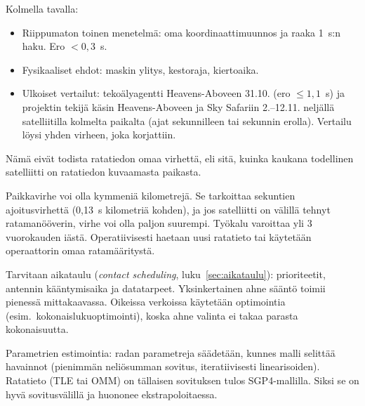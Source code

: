 \documentclass[a4paper,11pt]{article}
\begin{document}
Kolmella tavalla:
\begin{itemize}
  \item Riippumaton toinen menetelmä: oma koordinaattimuunnos ja raaka 1~s:n haku. Ero $< 0,3$~s.
  \item Fysikaaliset ehdot: maskin ylitys, kestoraja, kiertoaika.
  \item Ulkoiset vertailut: tekoälyagentti Heavens-Aboveen 31.10. (ero $\leq 1,1$~s) ja
    projektin tekijä käsin Heavens-Aboveen ja Sky Safariin 2.--12.11. neljällä satelliitilla kolmelta paikalta
    (ajat sekunnilleen tai sekunnin erolla). Vertailu löysi yhden virheen, joka korjattiin.
\end{itemize}
Nämä eivät todista ratatiedon omaa virhettä, eli sitä, kuinka kaukana todellinen satelliitti on ratatiedon kuvaamasta paikasta.

Paikkavirhe voi olla kymmeniä kilometrejä. Se tarkoittaa sekuntien ajoitusvirhettä (0,13~s kilometriä kohden), ja jos satelliitti on välillä tehnyt ratamanööverin, virhe voi olla paljon suurempi. Työkalu varoittaa yli 3 vuorokauden iästä. Operatiivisesti haetaan uusi ratatieto tai käytetään operaattorin omaa ratamääritystä.

Tarvitaan aikataulu (\emph{contact scheduling}, luku~\ref{sec:aikataulu}): prioriteetit, antennin kääntymisaika ja datatarpeet. Yksinkertainen ahne sääntö toimii pienessä mittakaavassa. Oikeissa verkoissa käytetään optimointia (esim.\ kokonaislukuoptimointi), koska ahne valinta ei takaa parasta kokonaisuutta.

Parametrien estimointia: radan parametreja säädetään, kunnes malli selittää havainnot (pienimmän neliösumman sovitus, iteratiivisesti linearisoiden). Ratatieto (TLE tai OMM) on tällaisen sovituksen tulos SGP4-mallilla. Siksi se on hyvä sovitusvälillä ja huononee ekstrapoloitaessa.
\end{document}
